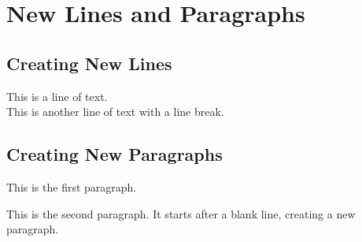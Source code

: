 \documentclass{article}
\begin{document}
\section{New Lines and Paragraphs}

\subsection{Creating New Lines}
This is a line of text. \\
This is another line of text with a line break.

\subsection{Creating New Paragraphs}
This is the first paragraph.

This is the second paragraph. It starts after a blank line, creating a new paragraph.
\end{document}
